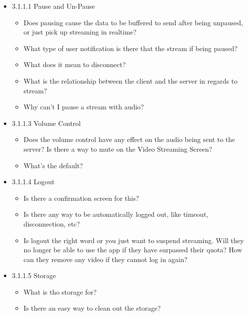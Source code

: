 \documentclass{article}
\begin{document}
\begin{itemize}
    \item 3.1.1.1  Pause and Un-Pause
    \begin{itemize}
        \item Does pausing cause the data to be buffered to send after being
            unpaused, or just pick up streaming in realtime?
        \item What type of user notification is there that the stream if being
            paused?
        \item What does it mean to disconnect?
        \item What is the relationship between the client and the server in
        regards to stream?
        \item Why can't I pause a stream with audio?
    \end{itemize}
    \item 3.1.1.3  Volume Control
    \begin{itemize}
        \item Does the volume control have any effect on the audio being sent
            to the server?  Is there a way to mute on the Video Streaming
            Screen?
        \item What's the default?
    \end{itemize}
    \item 3.1.1.4  Logout
    \begin{itemize}
        \item Is there a confirmation screen for this?
        \item Is there any way to be automatically logged out, like timeout,
            disconnection, etc?
        \item Is logout the right word or you just want to suspend streaming.
            Will they no longer be able to use the app if they have surpassed
            their quota?  How can they remove any video if they cannot log in
            again?
    \end{itemize}
    \item 3.1.1.5 Storage
    \begin{itemize}
        \item What is tho storage for?
        \item Is there an easy way to clean out the storage?
    \end{itemize}
\end{itemize}

\end{document}
